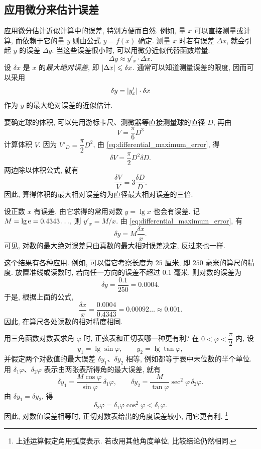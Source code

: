 \subsection{应用微分来估计误差}\label{subsec:108}
应用微分估计近似计算中的误差, 特别方便而自然.
例如, 量 $x$ 可以直接测量或计算, 而依赖于它的量 $y$ 则由公式 $y=f(x)$ 确定.
测量 $x$ 时若有误差 $\Delta x$, 就会引起 $y$ 的误差 $\Delta y$.
当这些误差很小时, 可以用微分近似代替函数增量:
$$
\Delta y\approx y'_x\cdot\Delta x.
$$
设 $\delta x$ 是 $x$ 的\emph{最大绝对误差}, 即 $\left| \Delta x \right|\leqslant\delta x$.
通常可以知道测量误差的限度, 因而可以采用
\begin{equation}\label{eq:differential_maximum_error}
\delta y=\left| y'_x \right|\cdot\delta x
\end{equation}
作为 $y$ 的最大绝对误差的近似估计.

\label{ex:sphere_volume_measurement_error}
要确定球的体积, 可以先用游标卡尺、测微器等直接测量球的直径 $D$, 再由
$$
V=\frac\pi6D^3
$$
计算体积 $V$.
因为 $V'_D=\dfrac\pi2D^2$, 由 \eqref{eq:differential_maximum_error}, 得
$$
\delta V=\frac\pi2D^2\delta D.
$$
两边除以体积公式, 就有
$$
\frac{\delta V}{V}=3\frac{\delta D}{D}.
$$
因此, 算得体积的最大相对误差约为直径最大相对误差的三倍.

\label{ex:common_logarithm_error}
设正数 $x$ 有误差, 由它求得的常用对数 $y=\lg x$ 也会有误差.
记 $M=\lg\mathrm{e}=0.4343\ldots$, 则 $y'_x=M/x$.
由 \eqref{eq:differential_maximum_error}, 有
$$
\delta y=M\frac{\delta x}{x}.
$$
可见, 对数的最大绝对误差只由真数的最大相对误差决定, 反过来也一样.

这个结果有各种应用. 例如, 可以借它考察长度为 $25$ 厘米, 即 $250$ 毫米的算尺的精度.
放置准线或读数时, 若向任一方向的误差不超过 $0.1$ 毫米,
则对数的误差为
$$
\delta y=\frac{0.1}{250}=0.0004.
$$
于是, 根据上面的公式,
$$
\frac{\delta x}{x}=\frac{0.0004}{0.4343}
=0.00092\ldots\approx0.001.
$$
因此, 在算尺各处读数的相对精度相同.

\label{ex:trigonometric_log_table_error}
用三角函数对数表求角 $\varphi$ 时, 正弦表和正切表哪一种更有利?
在 $0<\varphi<\dfrac\pi2$ 内, 设
$$
y_1=\lg\sin\varphi,\qquad y_2=\lg\tan\varphi,
$$
并假定两个对数值的最大误差 $\delta y_1$、$\delta y_2$ 相等,
例如都等于表中末位数的半个单位.
用 $\delta_1\varphi$、$\delta_2\varphi$ 表示由两张表所得角的最大误差, 就有
$$
\delta y_1=\frac{M\cos\varphi}{\sin\varphi}\,\delta_1\varphi,
\qquad
\delta y_2=\frac{M}{\tan\varphi}\sec^2\varphi\,\delta_2\varphi.
$$
由 $\delta y_1=\delta y_2$, 得
\label{eq:tangent_table_smaller_angle_error}
$$
\delta_2\varphi=\delta_1\varphi\cos^2\varphi<\delta_1\varphi.
$$
因此, 对数值误差相等时, 正切对数表给出的角度误差较小, 用它更有利.
\footnote{上述运算假定角用弧度表示. 若改用其他角度单位, 比较结论仍然相同.}

